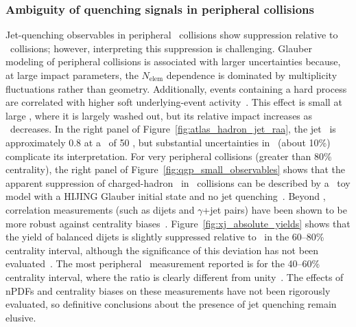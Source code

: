\subsubsection{Ambiguity of quenching signals in peripheral \texorpdfstring{\AxA}{AA} collisions}

Jet-quenching observables in peripheral \AxA\ collisions show suppression relative to \pxp\ collisions; however, interpreting this suppression is challenging.
Glauber modeling of peripheral collisions is associated with larger uncertainties because, at large impact parameters, the $N_{\mathrm{elem}}$ dependence is dominated by multiplicity fluctuations rather than geometry.
Additionally, events containing a hard process are correlated with higher soft underlying-event activity~\cite{CentBias:periphBias}.
This effect is small at large \NPART, where it is largely washed out, but its relative impact increases as \NPART\ decreases.
In the right panel of Figure~\ref{fig:atlas_hadron_jet_raa}, the jet \Raa\ is approximately $0.8$ at a \PT\ of 50 \GeV, but substantial uncertainties in \TAA\ (about 10\%) complicate its interpretation.
For very peripheral collisions (greater than 80\% centrality), the right panel of Figure~\ref{fig:qgp_small_observables} shows that the apparent suppression of charged-hadron \Raa\ in \PbxPb\ collisions can be described by a \pythia\ toy model with a HIJING Glauber initial state and no jet quenching~\cite{ALICE:periphBias,CentBias:periphBias}.
Beyond \Raa, correlation measurements (such as dijets and $\gamma$+jet pairs) have been shown to be more robust against centrality biases~\cite{CentBias:OO}.
Figure~\ref{fig:xj_absolute_yields} shows that the yield of balanced dijets is slightly suppressed relative to \pxp\ in the 60--80\% centrality interval, although the significance of this deviation has not been evaluated~\cite{HION-2018-28}.
The most peripheral \Jaa\ measurement reported is for the 40--60\% centrality interval, where the ratio is clearly different from unity~\cite{HION-2024-03}.
The effects of nPDFs and centrality biases on these measurements have not been rigorously evaluated, so definitive conclusions about the presence of jet quenching remain elusive.

